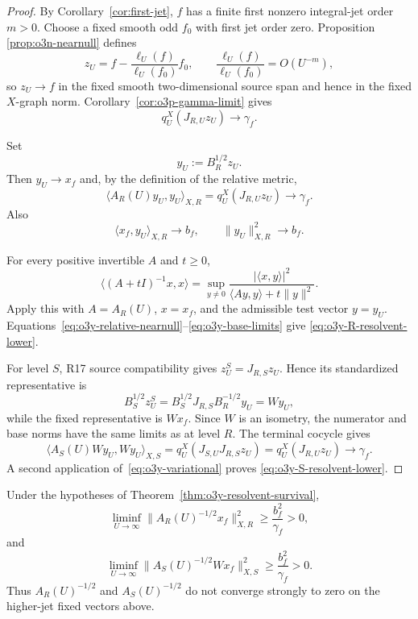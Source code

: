 \begin{proof}
By Corollary~\ref{cor:first-jet}, $f$ has a finite first nonzero integral-jet order
$m>0$.  Choose a fixed smooth odd $f_0$ with first jet order zero.  Proposition
\ref{prop:o3n-nearnull} defines
\[
 z_U
 =f-\frac{\ell_U(f)}{\ell_U(f_0)}f_0,
 \qquad
 \frac{\ell_U(f)}{\ell_U(f_0)}=O(U^{-m}),
\]
so $z_U\to f$ in the fixed smooth two-dimensional source span and hence in the fixed
$X$-graph norm.  Corollary~\ref{cor:o3p-gamma-limit} gives
\[
 q_U^X(J_{R,U}z_U)\longrightarrow\gamma_f.
\tag{O3Y.4}\label{eq:o3y-nearnull-energy}
\]

Set
\[
 y_U:=B_R^{1/2}z_U.
\]
Then $y_U\to x_f$ and, by the definition of the relative metric,
\[
 \langle A_R(U)y_U,y_U\rangle_{X,R}
 =q_U^X(J_{R,U}z_U)\longrightarrow\gamma_f.
\tag{O3Y.5}\label{eq:o3y-relative-nearnull}
\]
Also
\[
 \langle x_f,y_U\rangle_{X,R}\to b_f,
 \qquad
 \|y_U\|_{X,R}^2\to b_f.
\tag{O3Y.6}\label{eq:o3y-base-limits}
\]

For every positive invertible $A$ and $t\ge0$,
\[
 \langle(A+tI)^{-1}x,x\rangle
 =\sup_{y\ne0}
 \frac{|\langle x,y\rangle|^2}
 {\langle Ay,y\rangle+t\|y\|^2}.
\tag{O3Y.7}\label{eq:o3y-variational}
\]
Apply this with $A=A_R(U)$, $x=x_f$, and the admissible test vector $y=y_U$.
Equations~\eqref{eq:o3y-relative-nearnull}--\eqref{eq:o3y-base-limits} give
\eqref{eq:o3y-R-resolvent-lower}.

For level $S$, R17 source compatibility gives
$z_U^S=J_{R,S}z_U$.  Hence its standardized representative is
\[
 B_S^{1/2}z_U^S
 =B_S^{1/2}J_{R,S}B_R^{-1/2}y_U
 =Wy_U,
\]
while the fixed representative is $Wx_f$.  Since $W$ is an isometry, the numerator and
base norms have the same limits as at level $R$.  The terminal cocycle gives
\[
 \langle A_S(U)Wy_U,Wy_U\rangle_{X,S}
 =q_U^X(J_{S,U}J_{R,S}z_U)
 =q_U^X(J_{R,U}z_U)
 \to\gamma_f.
\]
A second application of~\eqref{eq:o3y-variational} proves
\eqref{eq:o3y-S-resolvent-lower}.
\end{proof}

\begin{corollary}
\label{cor:o3y-inverse-root-survival}
Under the hypotheses of Theorem~\ref{thm:o3y-resolvent-survival},
\[
 \boxed{
 \liminf_{U\to\infty}
 \|A_R(U)^{-1/2}x_f\|_{X,R}^2
 \ge\frac{b_f^2}{\gamma_f}>0,
 }
\tag{O3Y.8}\label{eq:o3y-R-inverse-lower}
\]
and
\[
 \boxed{
 \liminf_{U\to\infty}
 \|A_S(U)^{-1/2}Wx_f\|_{X,S}^2
 \ge\frac{b_f^2}{\gamma_f}>0.
 }
\tag{O3Y.9}\label{eq:o3y-S-inverse-lower}
\]
Thus $A_R(U)^{-1/2}$ and $A_S(U)^{-1/2}$ do not converge strongly to zero on the
higher-jet fixed vectors above.
\end{corollary}

